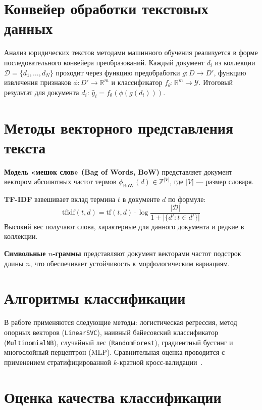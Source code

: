 \documentclass[12pt, a4paper]{report}
\begin{document}
\vspace{8pt}

\section{Конвейер обработки текстовых данных}

Анализ юридических текстов методами машинного обучения реализуется в форме
последовательного конвейера преобразований. Каждый документ $d_i$ из коллекции
$\mathcal{D} = \{d_1, \ldots, d_N\}$ проходит через функцию предобработки
$g: D \to D'$, функцию извлечения признаков $\phi: D' \to \mathbb{R}^m$
и классификатор $f_\theta: \mathbb{R}^m \to \mathcal{Y}$.
Итоговый результат для документа $d_i$: $\hat{y}_i = f_\theta(\phi(g(d_i)))$.

\section{Методы векторного представления текста}

\textbf{Модель «мешок слов» (Bag of Words, BoW)} представляет документ вектором
абсолютных частот термов $\phi_{\text{BoW}}(d) \in \mathbb{Z}^{|V|}$, где $|V|$ —
размер словаря.

\textbf{TF-IDF} взвешивает вклад термина $t$ в документе $d$ по формуле:
\[
  \text{tfidf}(t, d) = \text{tf}(t, d) \cdot \log\frac{|\mathcal{D}|}{1 + |\{d' : t \in d'\}|}
\]
Высокий вес получают слова, характерные для данного документа и редкие в коллекции.

\textbf{Символьные $n$-граммы} представляют документ векторами частот подстрок
длины $n$, что обеспечивает устойчивость к морфологическим вариациям.

\section{Алгоритмы классификации}

В работе применяются следующие методы: логистическая регрессия, метод опорных
векторов (\texttt{LinearSVC}), наивный байесовский классификатор (\texttt{MultinomialNB}),
случайный лес (\texttt{RandomForest}), градиентный бустинг и многослойный перцептрон
(MLP). Сравнительная оценка проводится с применением стратифицированной
$k$-кратной кросс-валидации~\cite{lec4}.

\section{Оценка качества классификации}
\end{document}
